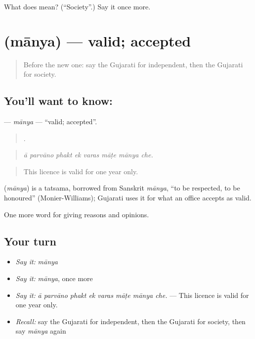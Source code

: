 \begin{tcolorbox}[breakable,colback=teal!4,colframe=teal!35!black,title={Before you move on}]
What does  mean? (\textquotedblleft{}Society\textquotedblright{}.) Say it once more.
\end{tcolorbox}
\section[\texorpdfstring{\gu{માન્ય} (mānya)}{માન્ય (mānya)}]{ (mānya) — valid; accepted}

\label{lesson:GU-C356-manya}



\begin{quote}
Before the new one: say the Gujarati for independent, then the Gujarati for society.
\end{quote}

\subsection*{You'll want to know: }
\textbf{} — \emph{mānya} — \textquotedblleft{}valid; accepted\textquotedblright{}.

\begin{quote}
       .
\end{quote}

\begin{quote}
\emph{ā parvāno phakt ek varas māṭe mānya che.}
\end{quote}

\begin{quote}
This licence is valid for one year only.
\end{quote}

\begin{cousinweb}
\textbf{} (\emph{mānya}) is a tatsama, borrowed from Sanskrit \emph{mānya}, \textquotedblleft{}to be respected, to be honoured\textquotedblright{} (Monier-Williams); Gujarati uses it for what an office accepts as valid.
\end{cousinweb}

\begin{grammarlens}[title={What you've built}]
One more word for giving reasons and opinions.
\end{grammarlens}

\subsection*{Your turn}
\begin{itemize}
\raggedright
  \item \emph{Say it:} \emph{mānya}
  \item \emph{Say it:} \emph{mānya}, once more
  \item \emph{Say it:} \emph{ā parvāno phakt ek varas māṭe mānya che.} — This licence is valid for one year only.
  \item \emph{Recall:} say the Gujarati for independent, then the Gujarati for society, then say \emph{mānya} again
\end{itemize}

